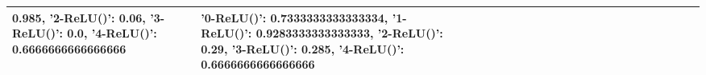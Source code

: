 \begin{tabular}{lllllllllllllllllllllll}
0.985, '2-ReLU()': 0.06, '3-ReLU()': 0.0, '4-ReLU()': 0.6666666666666666} & {'0-ReLU()': 0.7333333333333334, '1-ReLU()': 0.9283333333333333, '2-ReLU()': 0.29, '3-ReLU()': 0.285, '4-ReLU()': 0.6666666666666666} \\
\bottomrule
\end{tabular}
